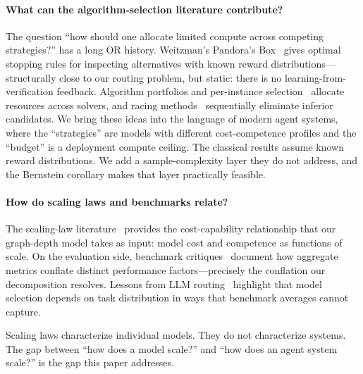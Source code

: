 \documentclass[twoside,11pt]{article}
\begin{document}
\paragraph{What can the algorithm-selection literature contribute?}
The question ``how should one allocate limited compute across competing strategies?'' has a long OR history.
Weitzman's Pandora's Box~\citep{kaufmann2016bestarm} gives optimal stopping rules for inspecting alternatives with known reward distributions---structurally close to our routing problem, but static: there is no learning-from-verification feedback.
Algorithm portfolios and per-instance selection~\citep{multiagentdesign2025,qiao2025scaling} allocate resources across solvers, and racing methods~\citep{kaufmann2016bestarm} sequentially eliminate inferior candidates.
We bring these ideas into the language of modern agent systems, where the ``strategies'' are models with different cost-competence profiles and the ``budget'' is a deployment compute ceiling.
The classical results assume known reward distributions.
We add a sample-complexity layer they do not address, and the Bernstein corollary makes that layer practically feasible.

\paragraph{How do scaling laws and benchmarks relate?}
The scaling-law literature~\citep{kaplan2020scaling,hoffmann2022chinchilla} provides the cost-capability relationship that our graph-depth model takes as input: model cost and competence as functions of scale.
On the evaluation side, benchmark critiques~\citep{linegoes2025} document how aggregate metrics conflate distinct performance factors---precisely the conflation our decomposition resolves.
Lessons from LLM routing~\citep{chen2025optimizing} highlight that model selection depends on task distribution in ways that benchmark averages cannot capture.

Scaling laws characterize individual models.
They do not characterize systems.
The gap between ``how does a model scale?'' and ``how does an agent system scale?'' is the gap this paper addresses.
\end{document}
